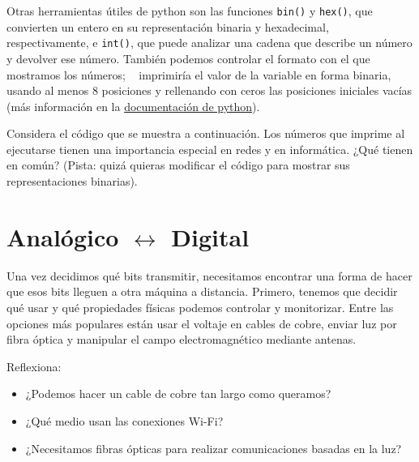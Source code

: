 Otras herramientas útiles de python son las funciones \texttt{bin()} y \texttt{hex()}, que convierten un entero 
en su representación binaria y hexadecimal, respectivamente, e \texttt{int()}, que puede analizar
una cadena que describe un número y devolver ese número. También podemos controlar el formato con el que mostramos los números;
\eg\  imprimiría el valor de la variable  en forma binaria, 
usando al menos 8 posiciones y rellenando con ceros las posiciones iniciales vacías
(más información en la \href{https://docs.python.org/3/reference/lexical_analysis.html#f-strings}{documentación de python}).

\begin{exercise}
Considera el código que se muestra a continuación. Los números que imprime al ejecutarse tienen una importancia especial en redes y en informática.
¿Qué tienen en común? (Pista: quizá quieras modificar el código para mostrar sus representaciones binarias).

\begin{center}
\end{center}
\label{ex:bitwisemanipulation}
\end{exercise}

\section{Analógico $\leftrightarrow$ Digital}\label{sec:piercing:analog_digital}

Una vez decidimos qué bits transmitir, necesitamos encontrar una forma de hacer que esos bits lleguen a otra máquina a distancia.
Primero, tenemos que decidir qué  usar y qué propiedades físicas podemos controlar y monitorizar.
Entre las opciones más populares están usar el voltaje en cables de cobre, enviar luz por fibra óptica y manipular el 
campo electromagnético mediante antenas.

\begin{exercise} Reflexiona:\\[-0.5cm]
\begin{itemize}
\item ¿Podemos hacer un cable de cobre tan largo como queramos?
\item ¿Qué medio usan las conexiones Wi-Fi? 
\item ¿Necesitamos fibras ópticas para realizar comunicaciones basadas en la luz?
\end{itemize}
\end{exercise}


